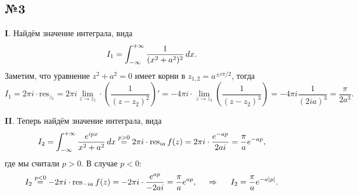  \subsection*{№3}


 \textbf{I}. Найдём значение интеграла, вида
 \begin{equation*}
     I_1= \int_{-\infty}^{+\infty} \frac{1}{(x^2 + a^2)^2} \, d x.
 \end{equation*}
 Заметим, что уравнение $z^2 + a^2 = 0$ имеет корни в $z_{1, 2} = a^{\pm i \pi/2}$, тогда
 \begin{equation*}
     I_1 = 2 \pi i \cdot \text{res}_{z_1} = 2 \pi i 
     \lim_{z \to z_1} \cdot \left(
        \frac{1}{(z- z_2)^2}
     \right)' = -4 \pi i \cdot \lim_{z \to z_1} \left(
        \frac{1}{(z-z_2)^3}
     \right) = - 4 \pi i \frac{1}{(2 i a)^3} = \frac{\pi}{2 a^3}.
 \end{equation*}


\textbf{II}.  Теперь найдём значение интеграла, вида
\begin{equation*}
    I_2 = \int_{-\infty}^{+\infty}  \frac{e^{i p x}}{x^2 + a^2} \, d x \overset{p>0}{=} 
    2 \pi i \cdot \mathop{\mathrm{res}}\nolimits_{ia} f(z) = 2 \pi i \cdot \frac{e^{- a p}}{2 a i} = \frac{\pi}{a} e^{-ap},
\end{equation*}
где мы считали $p>0$. В случае $p<0$:
\begin{equation*}
    I_2 \overset{p<0}{=}  -2 \pi i \cdot \mathop{\mathrm{res}}\nolimits_{-ia} f(z) = -2 \pi i \cdot \frac{e^{ap}}{-2ai} = \frac{\pi}{a} e^{ap},
    \hspace{0.5cm} \Rightarrow \hspace{0.5cm}
    I_2 = \frac{\pi}{a}e^{- a |p|}.
\end{equation*}